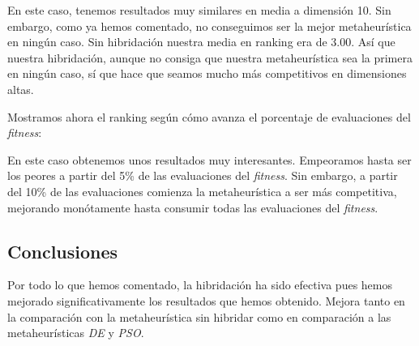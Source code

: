 \documentclass[11pt]{article}
\begin{document}
En este caso, tenemos resultados muy similares en media a dimensión 10. Sin embargo, como ya hemos comentado, no conseguimos ser la mejor metaheurística en ningún caso. Sin hibridación nuestra media en ranking era de 3.00. Así que nuestra hibridación, aunque no consiga que nuestra metaheurística sea la primera en ningún caso, sí que hace que seamos mucho más competitivos en dimensiones altas.

Mostramos ahora el ranking según cómo avanza el porcentaje de evaluaciones del \emph{fitness}:

\begin{table}[H]
\centering
{}
    \caption{Ranking según el avance del porcentaje de evaluaciones consumidas}
    \label{ranking_30_memetic}
\end{table}

En este caso obtenemos unos resultados muy interesantes. Empeoramos hasta ser los peores a partir del 5\% de las evaluaciones del \emph{fitness}. Sin embargo, a partir del 10\% de las evaluaciones comienza la metaheurística a ser más competitiva, mejorando monótamente hasta consumir todas las evaluaciones del \emph{fitness}.

\subsection{Conclusiones}

Por todo lo que hemos comentado, la hibridación ha sido efectiva pues hemos mejorado significativamente los resultados que hemos obtenido. Mejora tanto en la comparación con la metaheurística sin hibridar como en comparación a las metaheurísticas \emph{DE} y \emph{PSO}.
\end{document}
